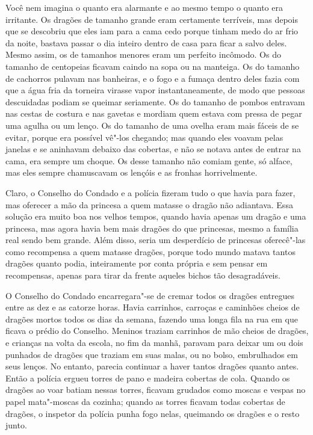 Você nem imagina o quanto era alarmante e ao mesmo tempo o quanto era
irritante. Os dragões de tamanho grande eram certamente terríveis,
mas depois que se descobriu que eles iam para a cama cedo porque
tinham medo do ar frio da noite, bastava passar o dia inteiro dentro
de casa para ficar a salvo deles. Mesmo assim, os de tamanhos menores eram um
perfeito incômodo. Os do tamanho de centopeias ficavam caindo na sopa
ou na manteiga. Os do tamanho de cachorros pulavam nas banheiras, e o
fogo e a fumaça dentro deles fazia com que a água fria da torneira
virasse vapor instantaneamente, de modo que pessoas descuidadas
podiam se queimar seriamente. Os do tamanho de pombos entravam nas
cestas de costura e nas gavetas e mordiam quem estava com pressa de
pegar uma agulha ou um lenço. Os do tamanho de uma ovelha eram mais
fáceis de se evitar, porque era possível vê"-los chegando; mas quando
eles voavam pelas janelas e se aninhavam debaixo das cobertas, e não
se notava antes de entrar na cama, era sempre um choque. Os desse
tamanho não comiam gente, só alface, mas eles sempre chamuscavam os
lençóis e as fronhas horrivelmente. 

Claro, o Conselho do Condado e a polícia fizeram tudo o que havia para
fazer, mas oferecer a mão da princesa a quem matasse o dragão não
adiantava. Essa solução era muito boa nos velhos tempos, quando havia
apenas um dragão e uma princesa, mas agora havia bem mais dragões do
que princesas, mesmo a família real sendo bem grande. Além disso,
seria um desperdício de princesas oferecê"-las como recompensa a quem
matasse dragões, porque todo mundo matava tantos dragões quanto
podia, inteiramente por conta própria e sem pensar em recompensas,
apenas para tirar da frente aqueles bichos tão desagradáveis. 

O
Conselho do Condado encarregara"-se de cremar todos os dragões
entregues entre as dez e as catorze horas. Havia carrinhos, carroças e
caminhões cheios de dragões mortos todos os dias da
semana, fazendo uma longa fila na rua em que ficava o prédio do
Conselho. Meninos traziam carrinhos de mão cheios de dragões, e
crianças na volta da escola, no fim da manhã, paravam para deixar um
ou dois punhados de dragões que traziam em suas malas, ou no bolso,
embrulhados em seus lenços. No entanto, parecia continuar a haver
tantos dragões quanto antes. Então a polícia ergueu torres de pano e
madeira cobertas de cola. Quando os dragões ao voar batiam nessas
torres, ficavam grudados como moscas e vespas no papel mata"-moscas da
cozinha; quando as torres ficavam todas cobertas de dragões, o
inspetor da polícia punha fogo nelas, queimando os dragões e o resto
junto.


